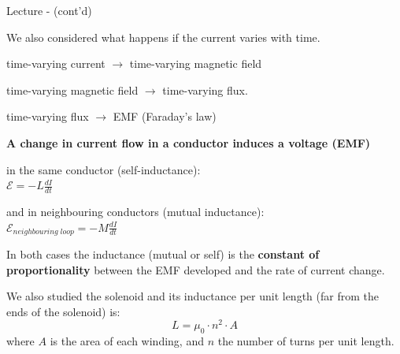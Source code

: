 \begin{frame}{Lecture \summarizedlecture - \lecturesummarytitle (cont'd)}

{ \scriptsize
We also considered what happens if the current varies with time.
\begin{itemize}
  { \scriptsize
   \item  time-varying current $\rightarrow$ time-varying magnetic field
   \item  time-varying magnetic field $\rightarrow$  time-varying flux.
   \item  time-varying flux $\rightarrow$ EMF (Faraday's law)
  }
\end{itemize}

\vspace{0.3cm}

{\bf A change in current flow in a conductor induces a voltage (EMF)}
\vspace{0.2cm}
\begin{itemize}
  { \scriptsize
   \item in the same conductor (self-inductance): \\
             $\displaystyle \mathcal{E} = - L \frac{dI}{dt}$
   \vspace{0.2cm}
   \item and in neighbouring conductors (mutual inductance):\\
            $\displaystyle \mathcal{E}_{neighbouring\;loop} = - M \frac{dI}{dt}$
  }
\end{itemize}

\vspace{0.2cm}

In both cases the inductance (mutual or self) is the {\bf constant of proportionality}
between the EMF developed and the rate of current change.

\vspace{0.2cm}

We also studied the solenoid and its inductance per unit length (far from the ends of the solenoid) is:
\begin{equation*}
  L =  \mu_0 \cdot n^2 \cdot A
\end{equation*}
where $A$ is the area of each winding, and $n$ the number of turns per unit length.
}
\end{frame}

%
%
%


